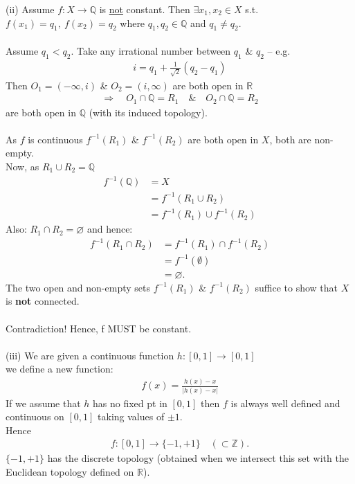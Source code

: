 \documentclass[12pt]{article}
\begin{document}
\newpage
\noindent
(ii) Assume $f:X\to\mathbb{Q}$ is \underline{not} constant. Then $\exists x_1,x_2\in X$ s.t. $f(x_1)=q_1,\ f(x_2)=q_2$ where $q_1,q_2\in\mathbb{Q}$
and $q_1\neq q_2$.\\
\\
Assume $q_1<q_2$. Take any irrational number between $q_1$ \& $q_2$ -- e.g.
\begin{align*}
i=q_1+\frac{1}{\sqrt{2}}(q_2-q_1)
\end{align*}
Then $O_1=(-\infty,i)$ \& $O_2=(i,\infty)$ are both open in $\mathbb{R}$
\begin{align*}
\Rightarrow\quad O_1\cap\mathbb{Q}=R_1\quad\&\quad O_2\cap\mathbb{Q}=R_2
\end{align*}
are both open in $\mathbb{Q}$ (with its induced topology).\\
\\
As $f$ is continuous $f^{-1}(R_1)$ \& $f^{-1}(R_2)$ are both open in $X$, both are non-empty.\\
Now, as $R_1\cup R_2=\mathbb{Q}$
\begin{align*}
f^{-1}(\mathbb{Q}) &= X \\
  &= f^{-1}(R_1\cup R_2) \\
  &= f^{-1}(R_1)\cup f^{-1}(R_2) \tag{5.1}
\end{align*}
Also: $R_1\cap R_2 = \varnothing$ and hence:
\begin{align*}
f^{-1}(R_1\cap R_2) &= f^{-1}(R_1)\cap f^{-1}(R_2) \\
&= f^{-1}(\emptyset) \\
&= \varnothing.
\end{align*}
The two open and non-empty sets $f^{-1}(R_1)$ \& $f^{-1}(R_2)$ suffice to show that $X$ is \textbf{not} connected.\\
\\
Contradiction!  Hence, f MUST be constant.\\
\\
(iii) We are given a continuous function $h:[0,1]\to[0,1]$\\
we define a new function:
\begin{align*}
f(x)=\frac{h(x)-x}{|h(x)-x|}
\end{align*}
If we assume that $h$ has no fixed pt in $[0,1]$ then $f$ is always well defined and continuous on $[0,1]$ taking values of $\pm1$.\\
Hence
\begin{align*}
f:[0,1]\to\{-1,+1\}\quad(\subset\mathbb{Z}).
\end{align*}
$\{-1,+1\}$ has the discrete topology (obtained when we intersect this set with the Euclidean topology defined on $\mathbb{R}$).\\
\end{document}
